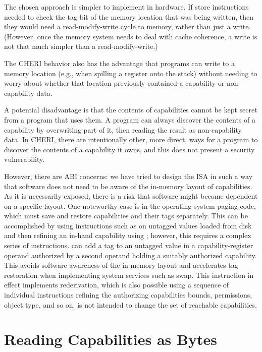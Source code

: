 The chosen approach is simpler to
implement in hardware. If store instructions needed to check the tag bit
of the memory location that was being written, then they would need a
read-modify-write cycle to memory, rather than just a write.
(However, once the memory system needs
to deal with cache coherence, a write is not that much simpler than a
read-modify-write.)

The CHERI behavior also has the advantage that programs can write to a
memory location (e.g., when spilling a register onto the stack) without
needing to worry about whether that location previously contained a
capability or non-capability data.

A potential disadvantage is that the contents of capabilities cannot be
kept secret from a program that uses them. A program can always discover
the contents of a capability by overwriting part of it, then reading the
result as non-capability data. In CHERI, there are
intentionally
other, more direct, ways
for a program to discover the contents of a capability it owns, and this
does not present a security vulnerability.

However, there are ABI concerns: we have tried to design the ISA in such a
way that software does not need to be aware of the in-memory layout of
capabilities.  As it is necessarily exposed, there is a risk that software
might become dependent on a specific layout.
One noteworthy case is in the operating-system paging code, which must
save and restore capabilities and their tags separately.
This can be
accomplished by using instructions such as  on untagged
values loaded from disk and then refining an in-hand capability using
; however,
this requires a complex series of instructions.
 can add a
tag to an untagged value in a capability-register operand authorized by a
second operand holding a suitably authorized capability.
This avoids software
awareness of the in-memory layout and accelerates tag restoration
when implementing system services such as swap.
This instruction in effect implements rederivation, which is also possible
using a sequence of individual instructions refining the authorizing
capabilities bounds, permissions, object type, and so on.
 is not intended to change the set of reachable
capabilities.

\section{Reading Capabilities as Bytes}

